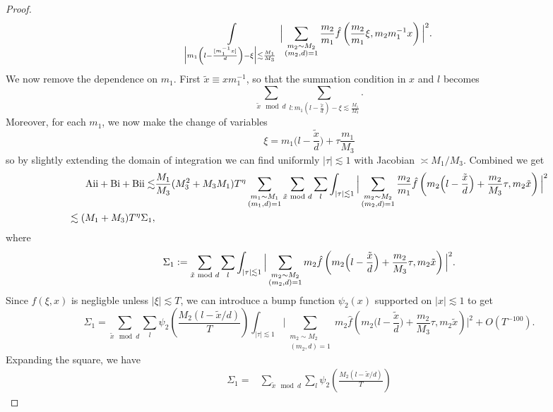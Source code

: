 \begin{proof}
\begin{align*}
            \int\displaylimits_{\Big|m_1\left(l-\frac{[m_1^{-1}x]}{d}\right)- \xi \Big|\lesssim \frac{M_1}{M_3}}
            \Big|
                \sum_{\substack{m_2\sim M_2\\(m_2,d)=1}} \frac{m_2}{m_1}\hat{f}\left(\frac{m_2}{m_1}\xi, m_2m_1^{-1}x\right) 
                \Big|^2.\\
    \end{align*}
    We now remove the dependence on $m_1$. First $\tilde{x} \equiv x m_1^{-1}$, so that the summation condition in $x$ and $l$ becomes \[
        \sum_{\tilde{x} \mod d} \sum_{l : m_1\left(l-\frac{\tilde{x}}{d}\right)- \xi \lesssim \frac{M_1}{M_3} }.
    \]
    Moreover, for each $m_1$, we now make the change of variables \[
    \xi = m_1\Big(l-\frac{\tilde{x}}{d}\Big)+\tau\frac{m_1}{M_3}
    \]
    so by slightly extending the domain of integration we can find uniformly $|\tau|\lesssim 1$ with Jacobian $\asymp M_1/M_3$.
    Combined we get
    \begin{align*}
        \rm{Aii}+{Bi}+{Bii} \lesssim &
        \frac{M_1}{M_3}(M_3^2+M_3M_1)T^{\eta}
        \sum_{\substack{m_1\sim M_1\\(m_1,d)=1}}\sum_{\tilde{x} \mod d} \sum_{l  } 
        \int_{|\tau|\lesssim 1}
        \Big|
            \sum_{\substack{m_2\sim M_2\\(m_2,d)=1}} \frac{m_2}{m_1}\hat{f}\left(m_2\Big(l-\frac{\tilde{x}}{d}\Big)+\frac{m_2}{M_3}\tau, m_2\tilde{x}\right) 
            \Big|^2\\
            \lesssim (M_1+M_3)T^{\eta} \Sigma_1,
    \end{align*}
    where\[
    \Sigma_1 \defeq \sum_{\tilde{x} \mod d} \sum_{l  } 
    \int_{|\tau|\lesssim 1}
    \Big|
        \sum_{\substack{m_2\sim M_2\\(m_2,d)=1}} {m_2}\hat{f}\left(m_2\Big(l-\frac{\tilde{x}}{d}\Big)+\frac{m_2}{M_3}\tau, m_2\tilde{x}\right) 
        \Big|^2.
    \]
    Since $\hat{f}(\xi,x)$ is negligble unless $|\xi|\lesssim T$, we can introduce a bump function $\psi_2(x)$ supported on $|x|\lesssim 1$ to get \[
        \Sigma_1 = \sum_{\tilde{x} \mod d} \sum_{l  } \psi_2\left(\frac{M_2(l-\tilde{x}/d)}{T}\right)
        \int_{|\tau|\lesssim 1}
        \Big|
            \sum_{\substack{m_2\sim M_2\\(m_2,d)=1}} {m_2}\hat{f}\left(m_2\Big(l-\frac{\tilde{x}}{d}\Big)+\frac{m_2}{M_3}\tau, m_2\tilde{x}\right) 
            \Big|^2+O(T^{-100}).
    \]
    Expanding the square, we have \begin{align*}
        \Sigma_1= & \sum_{\tilde{x} \mod d} \sum_{l  }  \psi_2\left(\frac{M_2(l-\tilde{x}/d)}{T}\right)

\end{align*}
\end{proof}
